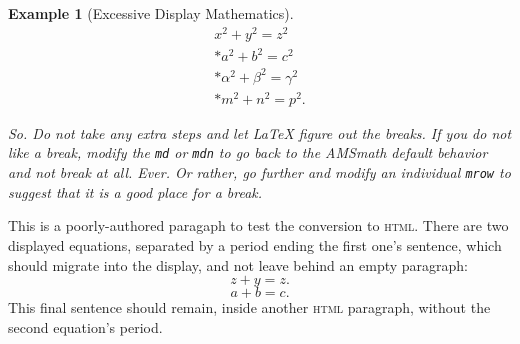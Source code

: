 \documentclass{sn-jnl}
\theoremstyle{thmstyleone}%
\theoremstyle{thmstyletwo}%
\newtheorem{example}[theorem]{Example}
\theoremstyle{thmstylethree}%
\newcommand{\mono}[1]{\texttt{#1}}
\newcommand{\initialism}[1]{\textsc{\MakeLowercase{#1}}}
\numberwithin{equation}{section}
\begin{document}
\begin{example}[Excessive Display Mathematics]
\begin{gather}
x^2+y^2=z^2\label{section-mathematics-4-9-3-2-45}\\*
a^2+b^2=c^2\label{section-mathematics-4-9-3-2-46}\\*
\alpha^2+\beta^2=\gamma^2\label{section-mathematics-4-9-3-2-47}\\*
m^2+n^2=p^2\text{.}\label{section-mathematics-4-9-3-2-48}
\end{gather}
%
\par
So.  Do not take any extra steps and let \LaTeX{} figure out the breaks.  If you do not like a break, modify the \mono{md} or \mono{mdn} to go back to the AMSmath default behavior and not break at all.  Ever.  Or rather, go further and modify an individual \mono{mrow} to suggest that it is a good place for a break.%
\end{example}
This is a poorly-authored paragaph to test the conversion to \initialism{HTML}.  There are two displayed equations, separated by a period ending the first one's sentence, which should migrate into the display, and not leave behind an empty paragraph:%
\begin{equation*}
z+y = z\text{.}
\end{equation*}
%
\begin{equation*}
a + b = c\text{.}
\end{equation*}
This final sentence should remain, inside another \initialism{HTML} paragraph, without the second equation's period.%
%
%
\typeout{************************************************}
\typeout{************************************************}
%
\end{document}
